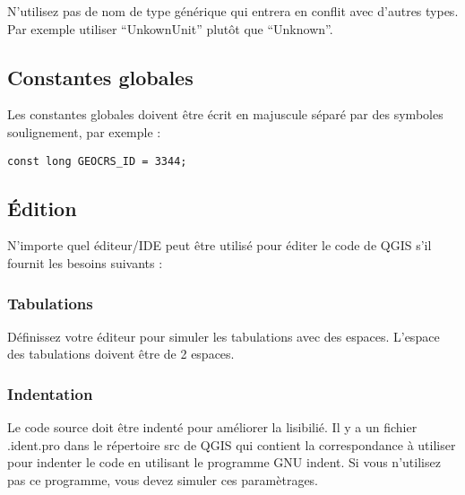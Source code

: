 N'utilisez pas de nom de type g\'en\'erique qui entrera en conflit avec d'autres types. Par exemple utiliser ``UnkownUnit'' plut\^ot que ``Unknown''.

\subsection{Constantes globales}
Les constantes globales doivent \^etre \'ecrit en majuscule s\'epar\'e par des symboles soulignement, par exemple :
\begin{verbatim}
const long GEOCRS_ID = 3344;
\end{verbatim}

\subsection{\'Edition}
N'importe quel \'editeur/IDE peut \^etre utilis\'e pour \'editer le code de QGIS s'il fournit les besoins suivants :

\subsubsection{Tabulations}
D\'efinissez votre \'editeur pour simuler les tabulations avec des espaces. L'espace des tabulations doivent \^etre de 2 espaces.

\subsubsection{Indentation}
Le code source doit \^etre indent\'e pour am\'eliorer la lisibili\'e. Il y a un fichier .ident.pro dans le r\'epertoire src de QGIS qui contient la correspondance \`a utiliser pour indenter le code en utilisant le programme GNU indent. Si vous n'utilisez pas ce programme, vous devez simuler ces param\`etrages.

